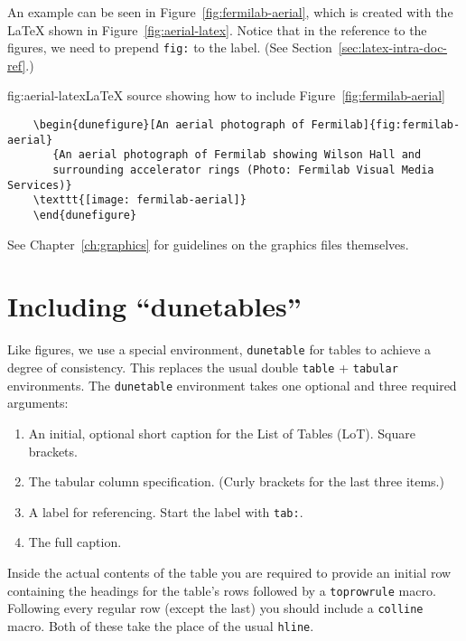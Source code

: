 An example can be seen in Figure~\ref{fig:fermilab-aerial}, which is created
with the \LaTeX{} shown in Figure~\ref{fig:aerial-latex}.  Notice that in the reference to the figures, we need to prepend \texttt{fig:} to the label. (See Section~\ref{sec:latex-intra-doc-ref}.)

\begin{dunefigure}{fig:aerial-latex}{\LaTeX{} source showing how to include Figure~\ref{fig:fermilab-aerial}}
\begin{verbatim}
    \begin{dunefigure}[An aerial photograph of Fermilab]{fig:fermilab-aerial}
       {An aerial photograph of Fermilab showing Wilson Hall and 
       surrounding accelerator rings (Photo: Fermilab Visual Media Services)}
    \texttt{[image: fermilab-aerial]}
    \end{dunefigure}
\end{verbatim}
\end{dunefigure}

See Chapter~\ref{ch:graphics} for guidelines on the graphics files themselves.

\FloatBarrier

\section{Including ``dunetables''}
\label{sec:latex-tables}

Like figures, we use a special environment, \texttt{dunetable} for
tables to achieve a degree of consistency.
This replaces the usual double \texttt{table} + \texttt{tabular} environments.
The \texttt{dunetable} environment takes one optional and three
required arguments:

\begin{enumerate}
\item An initial, optional short caption for the List of Tables (LoT). Square brackets.
\item The tabular column specification. (Curly brackets for the last three items.)
\item A label for referencing. Start the label with \texttt{tab:}. 
\item The full caption.
\end{enumerate}

Inside the actual contents of the table you are required to provide an
initial row containing the headings for the table's rows followed by a
\texttt{toprowrule} macro.
Following every regular row (except the last) you should include a
\texttt{colline} macro.
Both of these take the place of the usual \texttt{hline}.

